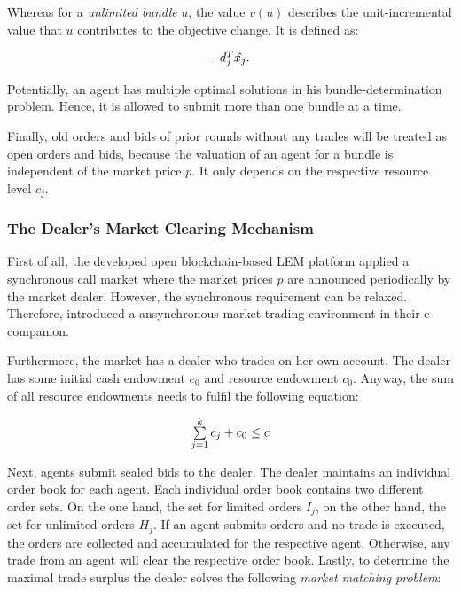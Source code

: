Whereas for a \textit{unlimited bundle} $u$, the value $v(u)$ describes the 
unit-incremental value that $u$ contributes to the objective change. It is defined
as:

\begin{equation*}
    \begin{array}{ll@{}ll}
        -d_{j}^{T}\hat{x_{j}}.
    \end{array}
\end{equation*}

Potentially, an agent has multiple optimal solutions in 
his bundle-determination problem. Hence, it is allowed to submit more than 
one bundle at a time. 

Finally, old orders and bids of prior rounds without any trades will be treated 
as open orders and bids, because the valuation of an agent for a bundle is
independent of the market price $p$.
It only depends on the respective resource level $c_{j}$. 

\subsubsection{The Dealer’s Market Clearing Mechanism}
First of all, the developed open blockchain-based LEM platform applied a synchronous 
call market where the market prices $p$ are announced periodically by the market dealer. 
However, the synchronous requirement can be relaxed. 
Therefore,  introduced a ansynchronous market trading 
environment in their e-companion. 

Furthermore, the market has a dealer who trades on her own account. 
The dealer has some initial cash endowment $e_{0}$ and resource endowment $c_{0}$.
Anyway, the sum of all resource endowments needs to fulfil the following equation:

\begin{equation*}
    \begin{array}{ll@{}ll}
        \sum\limits_{j=1}^{k} c_{j} + c_{0} \leq c
    \end{array}
\end{equation*}

Next, agents submit sealed bids to the dealer. The dealer maintains an 
individual order book for each agent. Each individual order book contains 
two different order sets. On the one hand, the set for limited orders $I_{j}$,
on the other hand, the set for unlimited orders $H_{j}$.
If an agent submits orders and no trade is executed, the orders are collected and 
accumulated for the respective agent. Otherwise, any trade from an agent will clear 
the respective order book. 
Lastly, to determine the maximal trade surplus the dealer solves 
the following \textit{market matching problem}:

